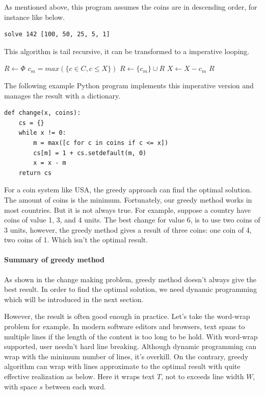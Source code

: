 \documentclass[UTF8]{article}
\begin{document}
As mentioned above, this program assumes the coins are in descending order, for
instance like below.

\lstset{language=Haskell}
\begin{lstlisting}
solve 142 [100, 50, 25, 5, 1]
\end{lstlisting}

This algorithm is tail recursive, it can be transformed to
a imperative looping.

\begin{algorithmic}[1]
  \State $R \gets \Phi$
    \State $c_m = max(\{c \in C, c \leq X\})$
    \State $R \gets \{c_m\} \cup R$
    \State $X \gets X - c_m$
  \EndWhile
  \State \Return $R$
\EndFunction
\end{algorithmic}

The following example Python program implements this imperative version
and manages the result with a dictionary.

\lstset{language=Python}
\begin{lstlisting}
def change(x, coins):
    cs = {}
    while x != 0:
        m = max([c for c in coins if c <= x])
        cs[m] = 1 + cs.setdefault(m, 0)
        x = x - m
    return cs
\end{lstlisting}

For a coin system like USA, the greedy approach can find the optimal solution.
The amount of coins is the minimum. Fortunately, our greedy method works in most
countries. But it is not always true. For example, suppose a country have
coins of value 1, 3, and 4 units. The best change for value 6, is to use two coins
of 3 units, however, the greedy method gives a result of three coins: one coin of 4,
two coins of 1. Which isn't the optimal result.

\paragraph{Summary of greedy method}
As shown in the change making problem, greedy method doesn't always give the
best result. In order to find the optimal solution, we need dynamic programming
which will be introduced in the next section.

However, the result is often good enough in practice. Let's take the word-wrap
problem for example. In modern software editors and browsers, text spans to
multiple lines if the length of the content is too long to be hold. With word-wrap
supported, user needn't hard line breaking. Although dynamic programming can wrap
with the minimum number of lines, it's overkill. On the contrary, greedy
algorithm can wrap with lines approximate to the optimal result with quite
effective realization as below. Here it wraps text $T$, not to exceeds line
width $W$, with space $s$ between each word.
\end{document}
